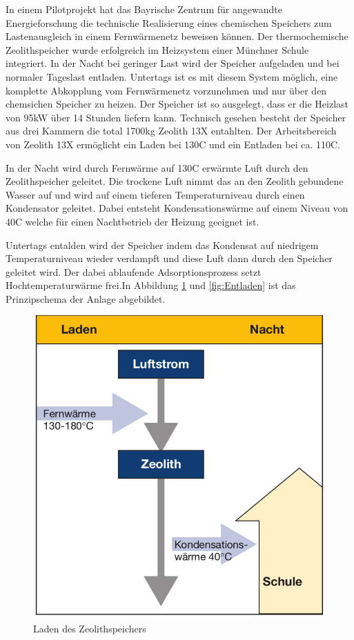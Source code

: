 \documentclass[11pt,a4paper]{scrartcl}
\begin{document}
In einem Pilotprojekt hat das Bayrische Zentrum für angewandte Energieforschung
die technische Realisierung eines chemischen Speichers zum Lastenausgleich in
einem Fernwärmenetz beweisen können. Der thermochemische Zeolithspeicher wurde
erfolgreich im Heizsystem einer Münchner Schule integriert. In der Nacht bei
geringer Last wird der Speicher aufgeladen und bei normaler Tageslast entladen.
Untertags ist es mit diesem System möglich, eine komplette Abkopplung vom
Fernwärmenetz vorzunehmen und nur über den chemsichen Speicher zu heizen. Der
Speicher ist so ausgelegt, dass er die Heizlast von 95kW über 14 Stunden liefern
kann. Technisch gesehen besteht der Speicher aus drei Kammern die total 1700kg
Zeolith 13X entahlten. Der Arbeitsbereich von Zeolith 13X ermöglicht ein Laden
bei 130\textdegree C und ein Entladen bei ca. 110\textdegree C.

In der Nacht wird durch Fernwärme auf 130\textdegree C erwärmte Luft durch den
Zeolithspeicher geleitet. Die trockene Luft nimmt das an den Zeolith gebundene
Wasser auf und wird auf einem tieferen Temperaturniveau durch einen Kondensator
geleitet. Dabei entsteht Kondensationswärme auf einem Niveau von 40\textdegree C
welche für einen Nachtbetrieb der Heizung geeignet ist. 

Untertags entalden wird der Speicher indem das Kondensat auf niedrigem
Temperaturniveau wieder verdampft und diese Luft dann durch den Speicher
geleitet wird. Der dabei ablaufende Adsorptionsprozess setzt Hochtemperaturwärme
frei.In Abbildung \ref{fig:Laden} und \ref{fig:Entladen} ist das Prinzipschema
der Anlage abgebildet.

\begin{figure}[h!]
\begin{center}
\includegraphics[scale=1]{images/Laden.jpg}
\caption{Laden des Zeolithspeichers \cite{BINE2}}
\label{fig:Laden}
\end{center}
\end{figure}
\end{document}
